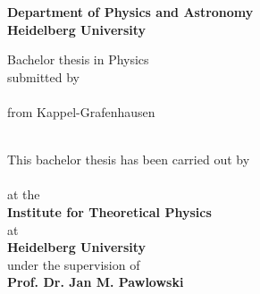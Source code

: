 
\begin{titlepage}
	\begin{center}
		\makeatletter
		\vspace{2cm}
		\Large\textbf{Department of Physics and Astronomy\\
			Heidelberg University}
		
		\vfill
		\normalsize
		Bachelor thesis in Physics\\
		\normalsize
		submitted by\\[0.4cm]
		\Large
		\textbf{\@author}\\[0.4cm]
		\normalsize
		from Kappel-Grafenhausen \\ [1cm]
		\large

		\normalsize
		\blankpage
		\thispagestyle{empty}
		\LARGE\textbf{\@title}\\[.4cm]

		\vfill
		\normalsize
		This bachelor thesis has been carried out by \\ 
		\vspace{3pt}
		\textbf{\@author{}}  \\ 
		\vspace{3pt}
		at the\\
		\vspace{3pt}
		\textbf{Institute for Theoretical Physics} \\ at \\\textbf{Heidelberg University}\\
		\vspace{5pt}
		under the supervision of\\
		\vspace{5pt}
		\textbf{Prof. Dr. Jan M. Pawlowski} 
		
		\makeatother
	\end{center}
\blankpage
\end{titlepage}